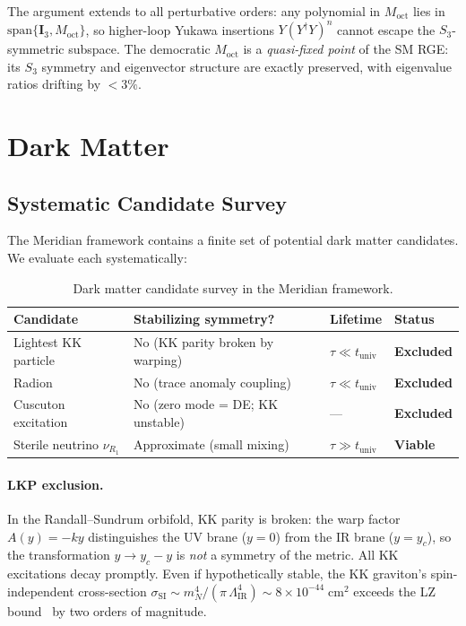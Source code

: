 The argument extends to all perturbative orders: any polynomial in $M_{\mathrm{oct}}$ lies in $\mathrm{span}\{\mathbf{I}_3, M_{\mathrm{oct}}\}$, so higher-loop Yukawa insertions $Y(Y^\dagger Y)^n$ cannot escape the $S_3$-symmetric subspace. The democratic $M_{\mathrm{oct}}$ is a \emph{quasi-fixed point} of the SM RGE: its $S_3$ symmetry and eigenvector structure are exactly preserved, with eigenvalue ratios drifting by $< 3\%$.


\section{Dark Matter}
\label{sec:4-dm}

\subsection{Systematic Candidate Survey}
\label{sec:4-dm-survey}

The Meridian framework contains a finite set of potential dark matter candidates. We evaluate each systematically:

\begin{table}[htbp]
\centering
\caption{Dark matter candidate survey in the Meridian framework.}
\label{tab:4-dm}
\small
\begin{tabular}{@{}llll@{}}
\toprule
Candidate & Stabilizing symmetry? & Lifetime & Status \\
\midrule
Lightest KK particle & No (KK parity broken by warping) & $\tau \ll t_{\mathrm{univ}}$ & \textbf{Excluded} \\
Radion & No (trace anomaly coupling) & $\tau \ll t_{\mathrm{univ}}$ & \textbf{Excluded} \\
Cuscuton excitation & No (zero mode = DE; KK unstable) & --- & \textbf{Excluded} \\
Sterile neutrino $\nu_{R_1}$ & Approximate (small mixing) & $\tau \gg t_{\mathrm{univ}}$ & \textbf{Viable} \\
\bottomrule
\end{tabular}
\end{table}

\paragraph{LKP exclusion.} In the Randall--Sundrum orbifold, KK parity is broken: the warp factor $A(y) = -ky$ distinguishes the UV brane ($y = 0$) from the IR brane ($y = y_c$), so the transformation $y \to y_c - y$ is \emph{not} a symmetry of the metric. All KK excitations decay promptly. Even if hypothetically stable, the KK graviton's spin-independent cross-section $\sigma_{\mathrm{SI}} \sim m_N^4/(\pi\, \Lambda_{\mathrm{IR}}^4) \sim 8 \times 10^{-44}\;\mathrm{cm}^2$ exceeds the LZ bound~\cite{ch4:LZ2024} by two orders of magnitude.

